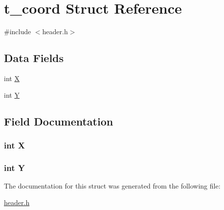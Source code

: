 \hypertarget{structt__coord}{\section{t\-\_\-coord Struct Reference}
\label{structt__coord}
}


{\ttfamily \#include $<$header.\-h$>$}

\subsection*{Data Fields}
\begin{DoxyCompactItemize}
\item 
int \hyperlink{structt__coord_a80c0944640e62d3ed6c5419c1bcc0c88}{X}
\item 
int \hyperlink{structt__coord_aa482c4cc86a24474e4fb19b5b5978778}{Y}
\end{DoxyCompactItemize}


\subsection{Field Documentation}
\hypertarget{structt__coord_a80c0944640e62d3ed6c5419c1bcc0c88}{
\subsubsection[{X}]{\setlength{\rightskip}{0pt plus 5cm}int X}}\label{structt__coord_a80c0944640e62d3ed6c5419c1bcc0c88}
\hypertarget{structt__coord_aa482c4cc86a24474e4fb19b5b5978778}{
\subsubsection[{Y}]{\setlength{\rightskip}{0pt plus 5cm}int Y}}\label{structt__coord_aa482c4cc86a24474e4fb19b5b5978778}


The documentation for this struct was generated from the following file\-:\begin{DoxyCompactItemize}
\item 
\hyperlink{header_8h}{header.\-h}\end{DoxyCompactItemize}
